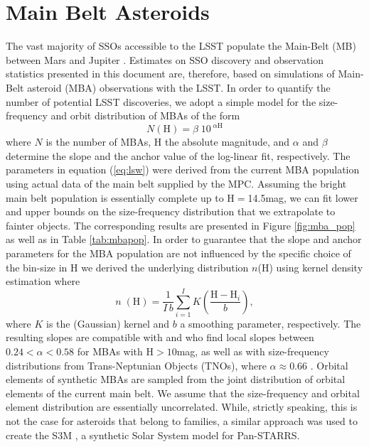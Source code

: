 \section{Main Belt Asteroids} \label{sec:mba}
The vast majority of SSOs accessible to the \gls{LSST} populate the Main-Belt (\gls{MB}) between Mars and Jupiter \citep{LSSTscibook2009}. Estimates on \gls{SSO} discovery and observation statistics presented in this document are, therefore, based on simulations of Main-Belt asteroid (\gls{MBA}) observations with the \gls{LSST}.
In order to quantify the number of potential \gls{LSST} discoveries, we adopt a simple model for the size-frequency and orbit distribution of MBAs of the form
\begin{equation}
 N(\text{H})=\beta\;10^{\;\alpha \text{H}}
 \label{eq:lsw}
\end{equation}
where $N$ is the number of MBAs, H the absolute magnitude, and $\alpha$ and $\beta$ determine the slope and the anchor value of the log-linear fit, respectively.
The parameters in equation (\ref{eq:lsw}) were derived from the current \gls{MBA} population using actual data of the main belt supplied by the \gls{MPC}.
Assuming the bright main belt population is essentially complete up to H$=$14.5mag, we can fit lower and upper bounds on the size-frequency distribution that we extrapolate to fainter objects. The corresponding results are presented in Figure \ref{fig:mba_pop} as well as in Table \ref{tab:mbapop}.
In order to guarantee that the slope and anchor parameters for the \gls{MBA} population are not influenced by the specific choice of the bin-size in H we derived the underlying distribution $n$(H) using kernel density estimation where
\begin{equation}
 n\;(\text{H})=\frac{1}{I\,b} \sum_{i=1}^{I} K\left(\frac{\text{H}-\text{H}_i}{b}\right),
 \label{eggl:eq:kernel}
\end{equation}
where $K$ is the (Gaussian) kernel and $b$ a smoothing parameter, respectively. The resulting slopes are compatible with \citet{jedicke2002} and \citet{heinze2019flux} who find local slopes between $0.24<\alpha<0.58$ for MBAs with H$>10$mag, as well as with size-frequency distributions from Trans-Neptunian Objects (TNOs), where $\alpha\approx0.66$ \citep{bernstein2004}.
Orbital elements of synthetic MBAs are sampled from the joint distribution of orbital elements of the current main belt. We assume that the size-frequency and orbital element distribution are essentially uncorrelated. While, strictly speaking, this is not the case for asteroids that belong to families, a similar approach was used to create the S3M \citep{s3m}, a synthetic Solar System model for \gls{Pan-STARRS}.
